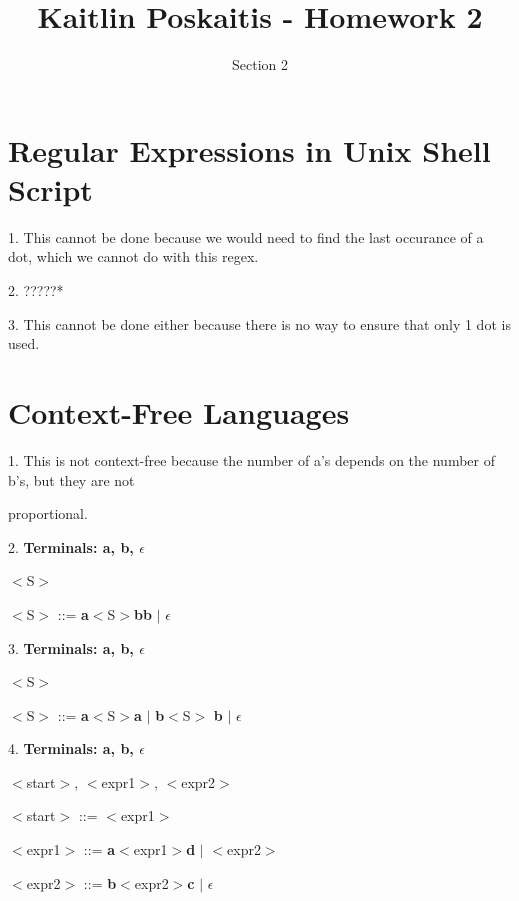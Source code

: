 \documentclass[11pt]{article}
\title{\bf Kaitlin Poskaitis - Homework 2}
\author{Section 2}
\date{}
\begin{document}
\maketitle

\section{Regular Expressions in Unix Shell Script}
1. This cannot be done because we would need to find the last occurance of a 
dot, which we cannot do with this regex.

2. ?????*

3. This cannot be done either because there is no way to ensure that only 1 
dot is used.

\section{Context-Free Languages}
1. This is not context-free because the number of a's depends on the number of 
b's, but they are not

proportional.

\vspace{5mm}

2. {\bf Terminals: a, b, $\epsilon$}
	
	 $<$S$>$

		
		\indent\indent $<$S$>$ ::= {\bf a}$<$S$>${\bf bb} $|$ {\bf $\epsilon$}

\vspace{5mm}

3. {\bf Terminals: a, b, $\epsilon$}

	 $<$S$>$


		\indent\indent $<$S$>$ ::= {\bf a}$<$S$>${\bf a} $|$ {\bf b}$<$S$>$
		{\bf b} $|$ $\epsilon$

\vspace{5mm}

4. {\bf Terminals: a, b, $\epsilon$}

	 $<$start$>$, $<$expr1$>$, $<$expr2$>$


		\indent\indent $<$start$>$ ::= $<$expr1$>$

		\indent\indent $<$expr1$>$ ::= {\bf a}$<$expr1$>${\bf d} $|$ $<$expr2$>$

		\indent\indent $<$expr2$>$ ::= {\bf b}$<$expr2$>${\bf c} $|$ 
		{\bf $\epsilon$}
\end{document}
